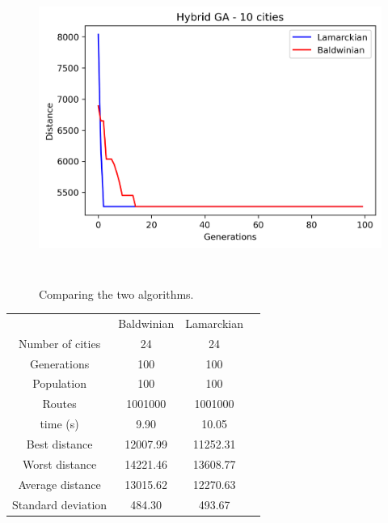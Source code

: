 \documentclass[a4paper,12pt]{article}
\begin{document}
\begin{figure}[H]
\centerline{\includegraphics[width=6in, height=4in]{hybridGen10.png}}
\caption{Comparing the two algorithms.}
\label{fig}
\end{figure}

\begin{center}
\begin{tabular}{ c c c c}
& Baldwinian & Lamarckian \\ 
Number of cities & 24 &24\\ 
Generations & 100 &100\\ 
Population & 100&100 \\  
Routes    &1001000 &1001000 \\
 time (s) &  9.90 & 10.05\\  
 Best distance & 12007.99 & 11252.31 \\ 
 Worst distance & 14221.46 & 13608.77 \\ 
 Average distance  & 13015.62 & 12270.63 \\ 
 Standard deviation  & 484.30 & 493.67 
\end{tabular}
\end{center}
\end{document}
